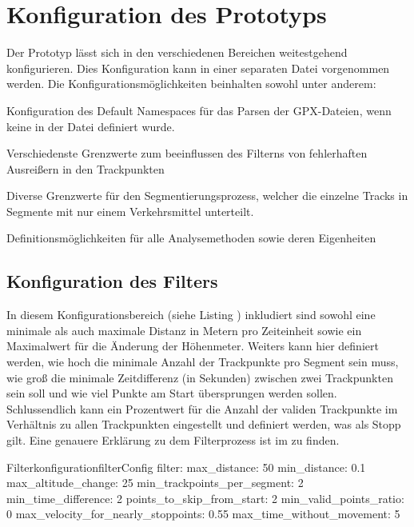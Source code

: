
\section{Konfiguration des Prototyps}
Der Prototyp lässt sich in den verschiedenen Bereichen weitestgehend konfigurieren. Dies Konfiguration kann in einer separaten Datei vorgenommen werden. Die Konfigurationsmöglichkeiten beinhalten sowohl unter anderem:
\begin{pitemize}
\item Konfiguration des Default Namespaces für das Parsen der GPX-Dateien, wenn keine in der Datei definiert wurde.
\item Verschiedenste Grenzwerte zum beeinflussen des Filterns von fehlerhaften Ausreißern in den Trackpunkten
\item Diverse Grenzwerte für den Segmentierungsprozess, welcher die einzelne Tracks in Segmente mit nur einem Verkehrsmittel unterteilt.
\item Definitionsmöglichkeiten für alle Analysemethoden sowie deren Eigenheiten
\end{pitemize}

\subsection{Konfiguration des Filters}
In diesem Konfigurationsbereich (siehe Listing ) inkludiert sind sowohl eine minimale als auch maximale Distanz in Metern pro Zeiteinheit sowie ein Maximalwert für die Änderung der Höhenmeter. Weiters kann hier definiert werden, wie hoch die minimale Anzahl der Trackpunkte pro Segment sein muss, wie groß die minimale Zeitdifferenz (in Sekunden) zwischen zwei Trackpunkten sein soll und wie viel Punkte am Start übersprungen werden sollen. Schlussendlich kann ein Prozentwert für die Anzahl der validen Trackpunkte im Verhältnis zu allen Trackpunkten eingestellt und definiert werden, was als Stopp gilt. Eine genauere Erklärung zu dem Filterprozess ist im  zu finden.

\begin{code}[]{Filterkonfiguration}{filterConfig}
  filter:
    max_distance: 50
    min_distance: 0.1
    max_altitude_change: 25
    min_trackpoints_per_segment: 2
    min_time_difference: 2
    points_to_skip_from_start: 2
    min_valid_points_ratio: 0
    max_velocity_for_nearly_stoppoints: 0.55
    max_time_without_movement: 5
\end{code}

